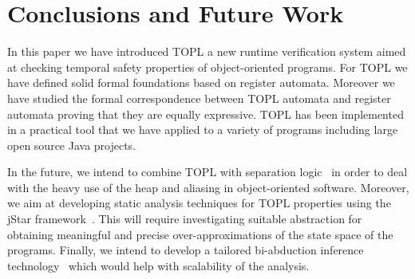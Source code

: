 \documentclass[9pt, preprint]{sigplanconf} %
\makeatletter
\newcommand{\noterg}[2]{\textcolor{gray}{[\textcolor{red}{#1}: #2]}}
\newcommand{\rg}[1]{\noterg{rg}{#1}}
\newcommand{\dd}[1]{\noterg{dd}{#1}}
\newcommand{\dinocomment}[1]{\dd{#1}}
\def\grammar#1{{
  \footnotesize
  \def\b##1{{\rm\Verb@##1@}}\def\*{$^*$}\def\?{$^?$}\def\({$($}\def\){$)$}
  \def\|{$\mid$}\def\+{$^+$}
  \smallskip
  \hbox to\hsize{\hfil\vbox{\halign{\hfil\it##&$\;::=\;$\it##\hfil&\qquad\rm##\hfil\cr#1}}\hfil}
  \smallskip
}}
\theoremstyle{definition}
\theoremstyle{remark}
\makeatother
\begin{document}
\section{Conclusions and Future Work}\label{sec:conclusions} %
In this paper we have introduced TOPL a new runtime verification system aimed at checking temporal safety properties of object-oriented programs. 
For TOPL we have defined solid formal foundations based on register automata. Moreover we have studied the formal correspondence between TOPL automata and register automata proving that they are equally expressive.
TOPL has been implemented in a practical tool that we have applied  to a variety of programs including large open source Java projects.
%

In the future, we intend to combine TOPL with  separation logic~\cite{reynolds2002} in order to deal with the heavy use of the heap and aliasing in object-oriented software.
Moreover, we aim at developing static analysis techniques for TOPL properties using the jStar framework~\cite{DBLP:conf/oopsla/DistefanoP08}.
This will require investigating suitable abstraction for obtaining meaningful and precise over-approximations of the state space of the programs.
Finally, we intend to develop a tailored bi-abduction inference technology~\cite{dblp:conf/popl/CalcagnoDOY09} which would help with scalability of the analysis.



\end{document}
